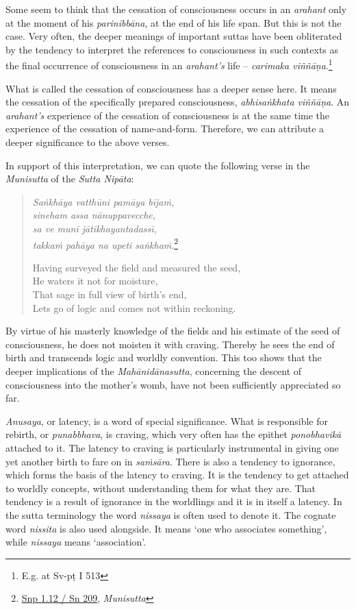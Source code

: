 Some seem to think that the cessation of consciousness occurs in an \emph{arahant} only at the moment of his \emph{parinibbāna}, at the end of his life span. But this is not the case. Very often, the deeper meanings of important suttas have been obliterated by the tendency to interpret the references to consciousness in such contexts as the final occurrence of consciousness in an \emph{arahant's} life -- \emph{carimaka viññāṇa}.\footnote{E.g. at Sv-pṭ I 513}

What is called the cessation of consciousness has a deeper sense here. It means the cessation of the specifically prepared consciousness, \emph{abhisaṅkhata viññāṇa}. An \emph{arahant's} experience of the cessation of consciousness is at the same time the experience of the cessation of name-and-form. Therefore, we can attribute a deeper significance to the above verses.

In support of this interpretation, we can quote the following verse in the \emph{Munisutta} of the \emph{Sutta Nipāta}:

\begin{quote}
\emph{Saṅkhāya vatthūni pamāya bījaṁ,}\\
\emph{sineham assa nānuppavecche,}\\
\emph{sa ve munī jātikhayantadassī,}\\
\emph{takkaṁ pahāya na upeti saṅkhaṁ}.\footnote{\href{https://suttacentral.net/snp1.12/pli/ms}{Snp 1.12 / Sn 209}, \emph{Munisutta}}

Having surveyed the field and measured the seed,\\
He waters it not for moisture,\\
That sage in full view of birth's end,\\
Lets go of logic and comes not within reckoning.
\end{quote}

By virtue of his masterly knowledge of the fields and his estimate of the seed of consciousness, he does not moisten it with craving. Thereby he sees the end of birth and transcends logic and worldly convention. This too shows that the deeper implications of the \emph{Mahānidānasutta}, concerning the descent of consciousness into the mother's womb, have not been sufficiently appreciated so far.

\emph{Anusaya}, or latency, is a word of special significance. What is responsible for rebirth, or \emph{punabbhava}, is craving, which very often has the epithet \emph{ponobhavikā} attached to it. The latency to craving is particularly instrumental in giving one yet another birth to fare on in \emph{saṁsāra}. There is also a tendency to ignorance, which forms the basis of the latency to craving. It is the tendency to get attached to worldly concepts, without understanding them for what they are. That tendency is a result of ignorance in the worldlings and it is in itself a latency. In the sutta terminology the word \emph{nissaya} is often used to denote it. The cognate word \emph{nissita} is also used alongside. It means `one who associates something', while \emph{nissaya} means `association'.

